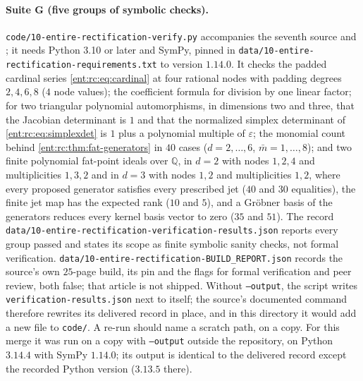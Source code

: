 \documentclass[11pt]{article}
\theoremstyle{plain}
\theoremstyle{plain}
\theoremstyle{plain}
\theoremstyle{definition}
\theoremstyle{definition}
\theoremstyle{definition}
\theoremstyle{definition}
\theoremstyle{remark}
\newcommand{\Q}{\mathbb Q}\newcommand{\Z}{\mathbb Z}\newcommand{\N}{\mathbb N}
\begin{document}
\paragraph{Suite G (five groups of symbolic checks).}
\texttt{code/10-entire-rectification-verify.py} accompanies the seventh source
and ; it needs Python
3.10 or later and SymPy, pinned in
\texttt{data/10-entire-rectification-requirements.txt} to version $1.14.0$.
It checks the padded cardinal series \eqref{ent:rc:eq:cardinal} at four
rational nodes with padding degrees $2,4,6,8$ ($4$ node values); the
coefficient formula for division by one linear factor; for two triangular
polynomial automorphisms, in dimensions two and three, that the Jacobian
determinant is $1$ and that the normalized simplex determinant of
\eqref{ent:rc:eq:simplexdet} is $1$ plus a polynomial multiple of
$\varepsilon$; the monomial count behind
\cref{ent:rc:thm:fat-generators} in $40$ cases ($d=2,\ldots,6$,
$\bar m=1,\ldots,8$); and two finite polynomial fat-point ideals over $\Q$, in
$d=2$ with nodes $1,2,4$ and multiplicities $1,3,2$ and in $d=3$ with nodes
$1,2$ and multiplicities $1,2$, where every proposed generator satisfies every
prescribed jet ($40$ and $30$ equalities), the finite jet map has the expected
rank ($10$ and $5$), and a Gr\"obner basis of the generators reduces every
kernel basis vector to zero ($35$ and $51$). The record
\texttt{data/10-entire-rectification-verification-results.json} reports every
group passed and states its scope as finite symbolic sanity checks, not formal
verification. \texttt{data/10-entire-rectification-BUILD\_REPORT.json} records
the source's own $25$-page build, its pin and the flags for formal
verification and peer review, both false; that article is not shipped. Without
\texttt{--output}, the script writes \texttt{verification-results.json} next
to itself; the source's documented command therefore rewrites its delivered
record in place, and in this directory it would add a new file to
\texttt{code/}. A re-run should name a scratch path, on a copy. For this merge
it was run on a copy with \texttt{--output} outside the repository, on Python
$3.14.4$ with SymPy $1.14.0$; its output is identical to the delivered record
except the recorded Python version ($3.13.5$ there).
\end{document}
